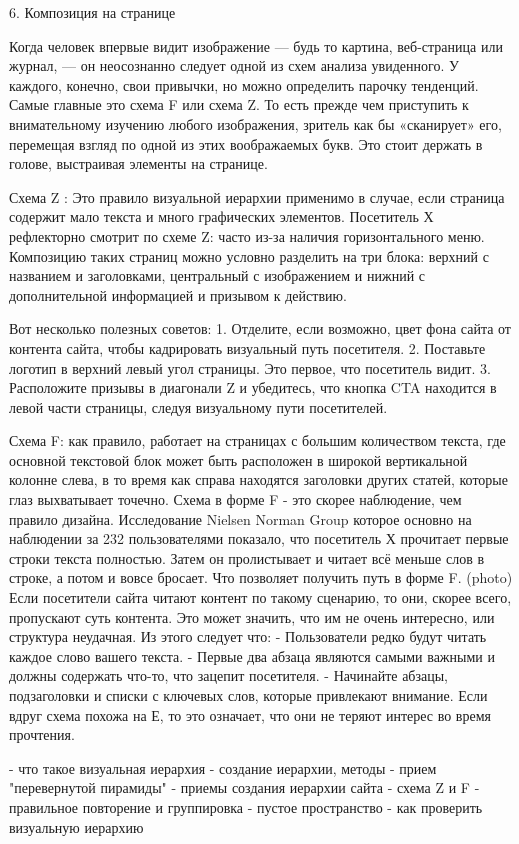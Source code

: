 \documentclass[10pt,twoside,slovak,a4paper]{article}
\begin{document}
6. Композиция на странице


Когда человек впервые видит изображение — будь то картина, веб-страница или журнал, — он неосознанно следует одной из схем анализа увиденного. У каждого, конечно, свои привычки, но можно определить парочку тенденций. Самые главные это схема F или схема Z. То есть прежде чем приступить к внимательному изучению любого изображения, зритель как бы «сканирует» его, перемещая взгляд по одной из этих воображаемых букв. Это стоит держать в голове, выстраивая элементы на странице. 

Схема Z : Это правило визуальной иерархии применимо в случае, если страница содержит мало текста и много графических элементов. Посетитель Х рефлекторно смотрит по схеме Z: часто из-за наличия горизонтального меню. Композицию таких страниц можно условно разделить на три блока: верхний с названием и заголовками, центральный с изображением и нижний с дополнительной информацией и призывом к действию.

Вот несколько полезных советов: 
1. Отделите, если возможно, цвет фона сайта от контента сайта, чтобы кадрировать визуальный путь посетителя. 
2. Поставьте логотип в верхний левый угол страницы. Это первое, что посетитель видит. 
3. Расположите призывы в диагонали Z и убедитесь, что кнопка CTA находится в левой части страницы, следуя визуальному пути посетителей. 

Схема F: как правило, работает на страницах с большим количеством текста, где основной текстовой блок может быть расположен в широкой вертикальной колонне слева, в то время как справа находятся заголовки других статей, которые глаз выхватывает точечно. Схема в форме F - это скорее наблюдение, чем правило дизайна. Исследование Nielsen Norman Group которое основно на наблюдении за 232 пользователями показало, что посетитель Х прочитает первые строки текста полностью. Затем он пролистывает и читает всё меньше слов в строке, а потом и вовсе бросает. Что позволяет получить путь в форме F. (photo)
Если посетители сайта читают контент по такому сценарию, то они, скорее всего, пропускают суть контента. Это может значить, что им не очень интересно, или структура неудачная. Из этого следует что:
- Пользователи редко будут читать каждое слово вашего текста.
- Первые два абзаца являются самыми важными и должны содержать что-то, что зацепит посетителя.
- Начинайте абзацы, подзаголовки и списки с ключевых слов, которые привлекают внимание.
Если вдруг схема похожа на Е, то это означает, что они не теряют интерес во время прочтения. 


\newline
- что такое визуальная иерархия \newline
- создание иерархии, методы \newline
- прием "перевернутой пирамиды" \newline
- приемы создания иерархии сайта \newline
- схема Z и F \newline
- правильное повторение и группировка \newline
- пустое пространство \newline
- как проверить визуальную иерархию \newline
\end{document}
